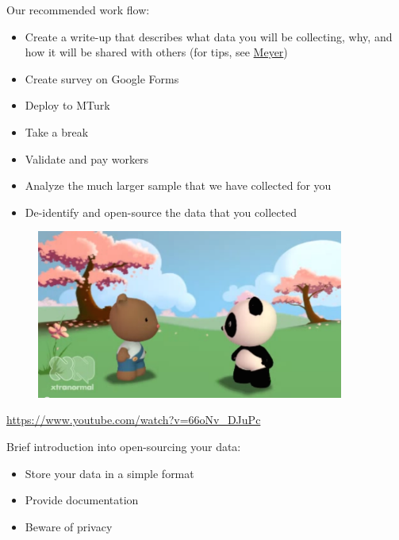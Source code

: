 \documentclass[aspectratio=169]{beamer}
\begin{document}
\begin{frame}

Our recommended work flow:
\begin{itemize}
\item Create a write-up that describes what data you will be collecting, why, and how it will be shared with others (for tips, see \href{https://doi.org/10.1177/2515245917747656}{Meyer})
\item Create survey on Google Forms
\item Deploy to MTurk
\item Take a break
\item Validate and pay workers
\item Analyze the much larger sample that we have collected for you
\item De-identify and open-source the data that you collected
\end{itemize}

\end{frame}
\begin{frame}

\begin{figure}
  \centering
  \includegraphics[width=0.9\textwidth]{figures/pandas_video}
\end{figure}

\url{https://www.youtube.com/watch?v=66oNv_DJuPc}

\end{frame}
\begin{frame}

Brief introduction into open-sourcing your data:
\begin{itemize}
\item Store your data in a simple format
\pause
\item Provide documentation
\pause
\item Beware of privacy
\end{itemize}

\end{frame}
\end{document}
